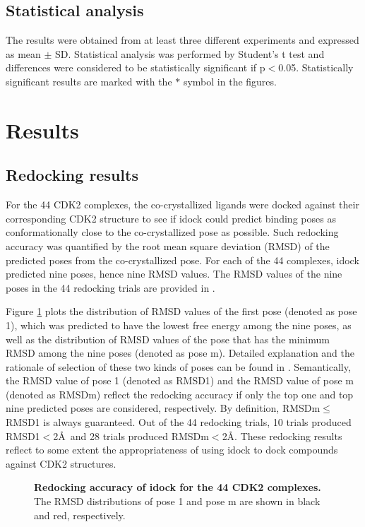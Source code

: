 \documentclass[10pt,letterpaper]{article}
\begin{document}
\subsection*{Statistical analysis}

The results were obtained from at least three different experiments and expressed as mean $\pm$ SD. Statistical analysis was performed by Student's t test and differences were considered to be statistically significant if p$<$0.05. Statistically significant results are marked with the $\ast$ symbol in the figures.

\section*{Results}

\subsection*{Redocking results}

For the 44 CDK2 complexes, the co-crystallized ligands were docked against their corresponding CDK2 structure to see if idock could predict binding poses as conformationally close to the co-crystallized pose as possible. Such redocking accuracy was quantified by the root mean square deviation (RMSD) of the predicted poses from the co-crystallized pose. For each of the 44 complexes, idock predicted nine poses, hence nine RMSD values. The RMSD values of the nine poses in the 44 redocking trials are provided in .

Figure \ref{RMSD1m} plots the distribution of RMSD values of the first pose (denoted as pose 1), which was predicted to have the lowest free energy among the nine poses, as well as the distribution of RMSD values of the pose that has the minimum RMSD among the nine poses (denoted as pose m). Detailed explanation and the rationale of selection of these two kinds of poses can be found in \cite{1362}. Semantically, the RMSD value of pose 1 (denoted as RMSD1) and the RMSD value of pose m (denoted as RMSDm) reflect the redocking accuracy if only the top one and top nine predicted poses are considered, respectively. By definition, RMSDm$\leq$RMSD1 is always guaranteed. Out of the 44 redocking trials, 10 trials produced RMSD1$<$2\AA\ and 28 trials produced RMSDm$<$2\AA. These redocking results reflect to some extent the appropriateness of using idock to dock compounds against CDK2 structures.

\begin{figure}%
\caption{{\bf Redocking accuracy of idock for the 44 CDK2 complexes.} The RMSD distributions of pose 1 and pose m are shown in black and red, respectively.}
\label{RMSD1m}
\end{figure}
\end{document}
